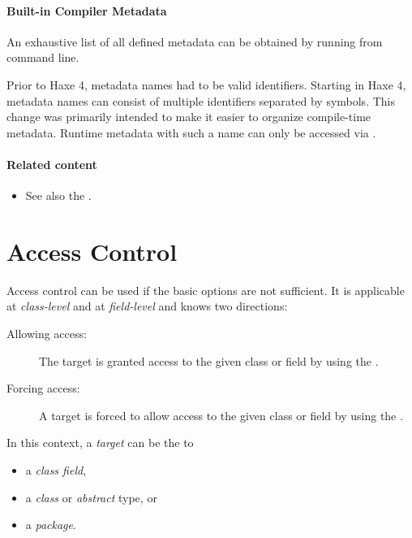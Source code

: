 \paragraph{Built-in Compiler Metadata}
An exhaustive list of all defined metadata can be obtained by running  from command line.


Prior to Haxe 4, metadata names had to be valid identifiers. Starting in Haxe 4, metadata names can consist of multiple identifiers separated by  symbols. This change was primarily intended to make it easier to organize compile-time metadata. Runtime metadata with such a name can only be accessed via .


\paragraph{Related content}
\begin{itemize}
	\item See also the .
\end{itemize}


\section{Access Control}
\label{lf-access-control}

Access control can be used if the basic  options are not sufficient. It is applicable at \emph{class-level} and at \emph{field-level} and knows two directions:

\begin{description}
	\item[Allowing access:] The target is granted access to the given class or field by using the  .
	\item[Forcing access:] A target is forced to allow access to the given class or field by using the  .
\end{description}

In this context, a \emph{target} can be the  to

\begin{itemize}
	\item a \emph{class field},
	\item a \emph{class} or \emph{abstract} type, or
	\item a \emph{package}.
\end{itemize}

